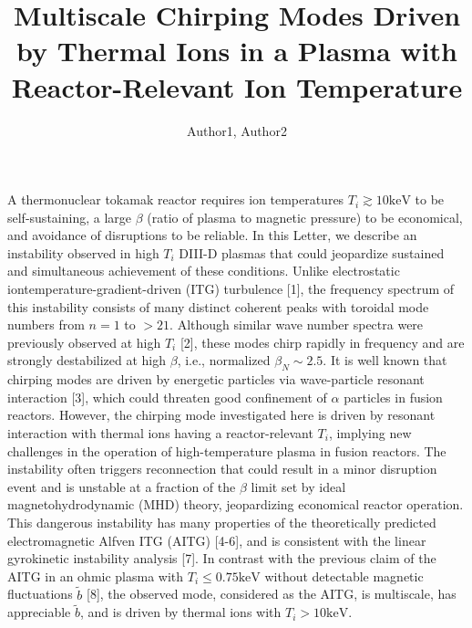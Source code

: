 \documentclass[oneside,onecolumn]{article}
\date{}
\title{Multiscale Chirping Modes Driven by Thermal Ions in a Plasma with Reactor-Relevant Ion Temperature}
\author{Author1, Author2}
\begin{document}
 \begin{sloppypar}
 \maketitle

 A thermonuclear tokamak reactor requires ion temperatures $T_{i} \gtrsim 10 \mathrm{keV}$ to be self-sustaining, a large $\beta$ (ratio of plasma to magnetic pressure) to be economical, and avoidance of disruptions to be reliable. In this Letter, we describe an instability observed in high $T_{i}$ DIII-D plasmas that could jeopardize sustained and simultaneous achievement of these conditions. Unlike electrostatic iontemperature-gradient-driven (ITG) turbulence [1], the frequency spectrum of this instability consists of many distinct coherent peaks with toroidal mode numbers from $n=1$ to $>21$. Although similar wave number spectra were previously observed at high $T_{i}$ [2], these modes chirp rapidly in frequency and are strongly destabilized at high $\beta$, i.e., normalized $\beta_{N} \sim 2.5$. It is well known that chirping modes are driven by energetic particles via wave-particle resonant interaction [3], which could threaten good confinement of $\alpha$ particles in fusion reactors. However, the chirping mode investigated here is driven by resonant interaction with thermal ions having a reactor-relevant $T_{i}$, implying new challenges in the operation of high-temperature plasma in fusion reactors. The instability often triggers reconnection that could result in a minor disruption event and is unstable at a fraction of the $\beta$ limit set by ideal magnetohydrodynamic (MHD) theory, jeopardizing economical reactor operation. This dangerous instability has many properties of the theoretically predicted electromagnetic Alfven ITG (AITG) [4-6], and is consistent with the linear gyrokinetic instability analysis [7]. In contrast with the previous claim of the AITG in an ohmic plasma with $T_{i} \leq 0.75 \mathrm{keV}$ without detectable magnetic fluctuations $\tilde{b}$ [8], the observed mode, considered as the AITG, is multiscale, has appreciable $\tilde{b}$, and is driven by thermal ions with $T_{i}>10 \mathrm{keV}$.
 

\end{sloppypar}
\end{document}
